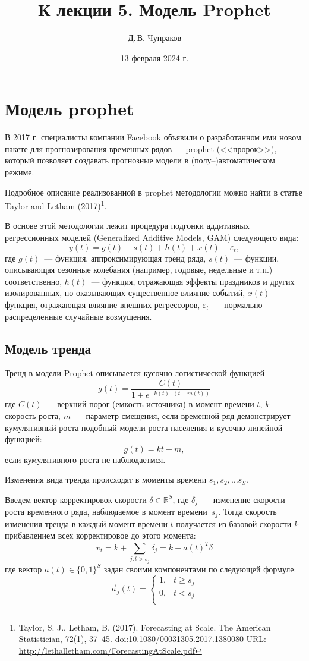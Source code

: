 \documentclass[a4paper,14pt]{extarticle}
\title{К лекции 5. Модель Prophet}
\author{Д.\,В. Чупраков}
\date{13 февраля 2024 г.}
\begin{document}
\maketitle



\section{Модель prophet}

В 2017 г. специалисты компании Facebook объявили о разработанном ими новом пакете для прогнозирования временных рядов — prophet (<<пророк>>), который позволяет создавать прогнозные модели в (полу–)автоматическом режиме. 

Подробное описание реализованной в prophet методологии можно найти в статье \href{http://lethalletham.com/ForecastingAtScale.pdf}{Taylor and Letham (2017)}\footnote{Taylor, S. J., Letham, B. (2017). Forecasting at Scale. The American Statistician, 72(1), 37–45. doi:10.1080/00031305.2017.1380080  URL: \url{http://lethalletham.com/ForecastingAtScale.pdf}}. 

В основе этой методологии лежит процедура подгонки аддитивных регрессионных моделей (Generalized Additive Models, GAM) следующего вида: 
$$
    y(t)=g(t)+s(t)+h(t)+x(t)+\varepsilon_t,
$$
где $g(t)$~--- функция, аппроксимирующая тренд ряда, $s(t)$~--- функции, описывающая сезонные колебания (например, годовые, недельные и т.п.) соответственно, $h(t)$~--- функция, отражающая эффекты праздников и других изолированных, но оказывающих существенное влияние событий,
$x(t)$~--- функция, отражающая влияние внешних регрессоров, $\varepsilon_t$~--- нормально распределенные случайные возмущения. 

\subsection{Модель тренда}

Тренд в модели Prophet описывается кусочно-логистической функцией
$$
    g(t) = \frac{C(t)}{1+e^{-k(t)\cdot (t-m(t))}}
$$
где 
$C(t)$~--- верхний порог (емкость источника) в момент времени $t$, $k$~--- скорость роста, $m$~--- параметр смещения, если временной ряд демонстрирует кумулятивный роста подобный модели роста населения и кусочно-линейной функцией:
$$
    g(t) = kt+m,
$$
если кумулятивного роста не наблюдаетмся.
 
Изменения вида тренда происходят в моменты времени  $s_1, s_2, \ldots s_S$.

Введем вектор корректировок скорости $\delta \in \mathbb{R}^S$, где $\delta_j$~--- изменение скорости роста временного ряда, наблюдаемое в момент времени~$s_j$. 
Тогда скорость изменения тренда в каждый момент времени $t$ получается из базовой скорости $k$ прибавлением всех 
корректировое до этого момента: 
$$
v_t = k + \sum_{j: t>s_j} \delta_j = k + a(t)^T\delta
$$
где вектор $a(t) \in \{0, 1\}^S$ задан своими компонентами по следующей формуле:
$$
    \vec{a}_j(t) = 
    \begin{cases}
        1,& t \geqslant s_j\\
        0,& t < s_j\\
    \end{cases}
$$
\end{document}
